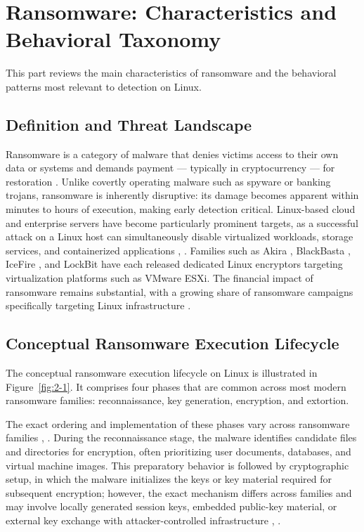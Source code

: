 \section{Ransomware: Characteristics and Behavioral Taxonomy}\label{sec:2.1}

This part reviews the main characteristics of ransomware and the behavioral patterns most relevant to detection on Linux.

\subsection{Definition and Threat Landscape}\label{sec:2.1.1}

Ransomware is a category of malware that denies victims access to their own data or systems and demands payment --- typically in cryptocurrency --- for restoration \cite{ref1}. Unlike covertly operating malware such as spyware or banking trojans, ransomware is inherently disruptive: its damage becomes apparent within minutes to hours of execution, making early detection critical. Linux-based cloud and enterprise servers have become particularly prominent targets, as a successful attack on a Linux host can simultaneously disable virtualized workloads, storage services, and containerized applications \cite{ref2}, \cite{ref3}. Families such as Akira \cite{ref4}, BlackBasta \cite{ref5}, IceFire \cite{ref6}, and LockBit \cite{ref7} have each released dedicated Linux encryptors targeting virtualization platforms such as VMware ESXi. The financial impact of ransomware remains substantial, with a growing share of ransomware campaigns specifically targeting Linux infrastructure \cite{ref1}.

\subsection{Conceptual Ransomware Execution Lifecycle}\label{sec:2.1.2}

The conceptual ransomware execution lifecycle on Linux is illustrated in Figure~\ref{fig:2-1}. It comprises four phases that are common across most modern ransomware families: reconnaissance, key generation, encryption, and extortion.

The exact ordering and implementation of these phases vary across ransomware families \cite{ref2}, \cite{ref8}. During the reconnaissance stage, the malware identifies candidate files and directories for encryption, often prioritizing user documents, databases, and virtual machine images. This preparatory behavior is followed by cryptographic setup, in which the malware initializes the keys or key material required for subsequent encryption; however, the exact mechanism differs across families and may involve locally generated session keys, embedded public-key material, or external key exchange with attacker-controlled infrastructure \cite{ref2}, \cite{ref8}.

